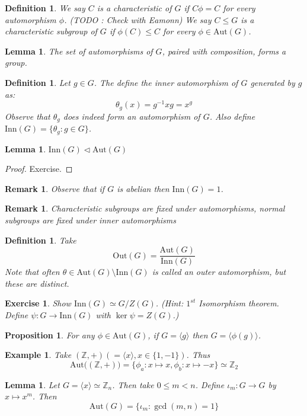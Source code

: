 \documentclass[a4paper,10pt]{article}
\newcommand{\ZZ}{\mathbb{Z}}
\newtheorem{Def}[thm]{Definition}
\newtheorem{prop}[thm]{Proposition}
\newtheorem{eg}[thm]{Example}
\newtheorem{Ex}[thm]{Exercise}
\newtheorem{Lem}[thm]{Lemma}
\newtheorem{rem}[thm]{Remark}
\begin{document}
\begin{Def}
We say $C$ is a characteristic of $G$ if $C \phi = C$ for every automorphism $\phi$.
(TODO : Check with Eamonn)
We say $C \leq G$ is a characteristic subgroup of $G$ if $\phi(C) \leq C$ for every $\phi \in \text{Aut}(G)$. 
\end{Def}
\begin{Lem}
The set of automorphisms of $G$, paired with composition, forms a group. 
\end{Lem}
\begin{Def}
Let $g \in G$. The define the inner automorphism of $G$ generated by $g$ as:
\[ \theta_g(x) = g^{-1} x g = x^g \]
Observe that $\theta_g$ does indeed form an automorphism of $G$. Also define $\text{Inn} (G) = \{\theta_g : g \in G \}$. 
\end{Def}
\begin{Lem}
$\text{Inn}(G) \triangleleft \text{Aut}(G)$
\end{Lem}
\begin{proof}
Exercise.
\end{proof}
\begin{rem}
Observe that if $G$ is abelian then $\text{Inn}(G) = 1$. 
\end{rem}
\begin{rem}
Characteristic subgroups are fixed under automorphisms, normal subgroups are fixed under inner automorphisms
\end{rem}
\begin{Def}
Take 
\[ \text{Out} (G) = \frac{\text{Aut}(G)}{\text{Inn}(G)} \]
Note that often $\theta \in \text{Aut}(G) \setminus \text{Inn}(G)$ is called an outer automorphism, but these are distinct. 
\end{Def}
\begin{Ex}
Show $\text{Inn}(G) \simeq G / Z(G)$. (Hint: $1^{st}$ Isomorphism theorem. Define $\psi : G \rightarrow \text{Inn}(G)$ with $\ker \psi = Z(G)$.)
\end{Ex}
\begin{prop}
For any $\phi \in \text{Aut}(G)$, if $G = \langle g \rangle$ then $G = \langle \phi(g) \rangle$.
\end{prop}

\begin{eg}
Take $(\ZZ, +) (= \langle x \rangle, x \in \{1,-1\})$. Thus 
\[ \text{Aut} \big( (\ZZ, +) \big) = \{ \phi_a : x \mapsto x, \phi_b : x \mapsto -x\} \simeq \ZZ_2 \]
\end{eg}

\begin{Lem}
Let $G = \langle x \rangle \simeq \ZZ_n$. Then take $0 \leq m < n$. Define $\iota_m : G \rightarrow G$ by $x \mapsto x^m$. Then
\[ \text{Aut}(G) = \{ \iota_m : \gcd(m,n) = 1 \} \]
\end{Lem}
\end{document}
